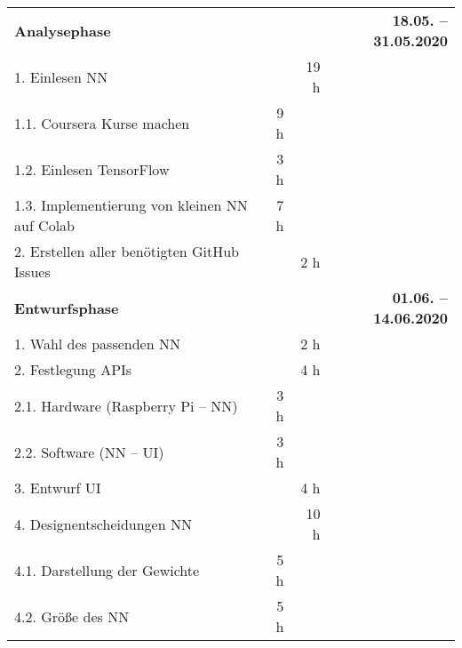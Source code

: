 \begin{tabularx}{\textwidth}{Xrrr}
\rowcolor{heading}\textbf{Analysephase} & \textbf{} & \textbf{} & \textbf{18.05. -- 31.05.2020} \\
1. Einlesen NN  &       &    19 h &  \\
\rowcolor{odd}\hspace{1cm}1.1. Coursera Kurse machen & 9 h   &       &  \\
\hspace{1cm}1.2. Einlesen TensorFlow & 3 h   &       &  \\
\rowcolor{odd}\hspace{1cm}1.3. Implementierung von kleinen NN auf Colab & 7 h   &       &  \\
2. Erstellen aller ben\"otigten GitHub Issues&       & 2 h   &  \\
\rowcolor{heading}\textbf{Entwurfsphase} & \textbf{} & \textbf{} & \textbf{01.06. -- 14.06.2020} \\
1. Wahl des passenden NN &       & 2 h   &  \\
\rowcolor{odd}2. Festlegung APIs &       & 4 h   &  \\
\hspace{1cm}2.1. Hardware (Raspberry Pi -- NN) & 3 h   &       &  \\
\rowcolor{odd}\hspace{1cm}2.2. Software (NN -- UI)& 3 h   &       &  \\
3. Entwurf UI &       & 4 h   &  \\
\rowcolor{odd}4. Designentscheidungen NN &       & 10 h   &  \\
\hspace{1cm}4.1. Darstellung der Gewichte & 5 h   &       &  \\
\rowcolor{odd}\hspace{1cm}4.2. Gr\"o{\ss}e des NN & 5 h   &       &  \\

\end{tabularx}
